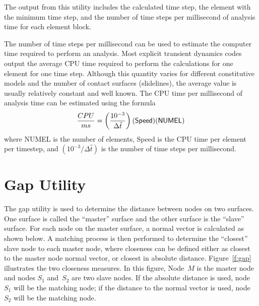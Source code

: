 The output from this utility includes the calculated time step, the
element with the minimum time step, and the number of time steps per
millisecond of analysis time for each element block.

The number of time steps per millisecond can be used to estimate the
computer time required to perform an analysis.  Most explicit transient
dynamics codes output the average CPU time required to perform the
calculations for one element for one time step. Although this quantity
varies for different constitutive models and the number of contact
surfaces (slidelines), the average value is usually relatively constant
and well known.  The CPU time per millisecond of analysis time can be
estimated using the formula
\begin{equation}
{CPU\over ms} = \left(10^{-3}\over \Delta\hat t\right)
                ({\sf Speed})({\sf NUMEL})
\end{equation}
where {\sf NUMEL} is the number of elements, {\sf Speed} is the CPU time
per element per timestep, and $(10^{-3}/\Delta\hat t)$ is the number of
time steps per millisecond.

\section{Gap Utility}\label{sec:gap}

The gap utility is used to determine the distance between nodes on two
surfaces.  One surface is called the ``master'' surface and the other
surface is the ``slave'' surface.  For each node on the master surface,
a normal vector is calculated as shown below.  A matching process is
then performed to determine the ``closest'' slave node to each master
node, where closeness can be defined either as closest to the master
node normal vector, or closest in absolute distance.  Figure~\ref{f:gap}
illustrates the two closeness measures.  In this figure, Node~$M$ is the
master node and nodes $S_1$ and~$S_2$ are two slave nodes.  If the
absolute distance is used, node~$S_1$ will be the matching node; if the
distance to the normal vector is used, node~$S_2$ will be the matching
node.

